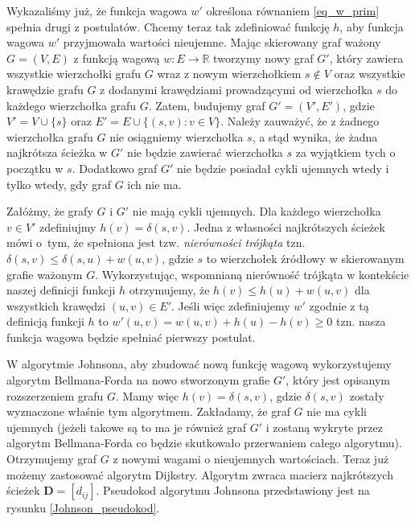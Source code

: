 \documentclass[12pt,a4paper]{book}
\theoremstyle{definition}
\newcommand{\bR}{{\mathbb R}}
\numberwithin{equation}{chapter}
\begin{document}
Wykazaliśmy już, że funkcja wagowa $w'$ określona równaniem \eqref{eq_w_prim} spełnia drugi z postulatów. 
Chcemy teraz tak zdefiniować funkcję $h$, aby funkcja wagowa $w'$ przyjmowała wartości nieujemne. Mając skierowany graf ważony $G = (V,E)$ z funkcją wagową $w\colon E\to\bR$ tworzymy nowy graf $G'$, który zawiera wszystkie wierzchołki grafu $G$ wraz z nowym wierzchołkiem $s \notin V$ oraz wszystkie krawędzie grafu $G$ z dodanymi krawędziami prowadzącymi od wierzchołka $s$ do każdego wierzchołka grafu $G$. Zatem, budujemy graf $G' = (V', E')$, gdzie $V' = V \cup \{s\}$ oraz $E' = E \cup \big\{(s, v): v \in V\big\}$. Należy zauważyć, że z żadnego wierzchołka grafu $G$ nie osiągniemy wierzchołka $s$, a stąd wynika, że żadna najkrótsza ścieżka w $G'$ nie będzie zawierać wierzchołka $s$ za wyjątkiem tych o początku w $s$. Dodatkowo graf $G'$ nie będzie posiadał cykli ujemnych wtedy i tylko wtedy, gdy graf $G$ ich nie ma.

Załóżmy, że grafy $G$ i $G'$ nie mają cykli ujemnych. Dla każdego wierzchołka $v \in V'$ zdefiniujmy $h(v) = \delta(s, v)$. Jedna z własności najkrótszych ścieżek mówi o~tym, że spełniona jest tzw. \textit{nierówności trójkąta} tzn.  $\delta(s,v) \leq \delta(s,u) + w(u, v)$, gdzie $s$ to wierzchołek źródłowy w skierowanym grafie ważonym $G$. Wykorzystując,  wspomnianą nierówność trójkąta w kontekście naszej definicji funkcji $h$ otrzymujemy, że $h(v) \leq h(u) + w(u,v)$ dla wszystkich krawędzi $(u, v) \in E'$. Jeśli więc zdefiniujemy $w'$ zgodnie z tą definicją funkcji $h$ to $w'(u,v) = w(u,v) + h(u) -h(v) \geq 0$ tzn. nasza funkcja wagowa będzie spełniać pierwszy postulat.

W algorytmie Johnsona, aby zbudować nową funkcję wagową wykorzystujemy algorytm Bellmana-Forda na nowo stworzonym grafie $G'$, który jest opisanym rozszerzeniem grafu $G$. Mamy więc $h(v) = \delta(s, v)$,  gdzie $\delta(s, v)$ zostały wyznaczone właśnie tym algorytmem. Zakładamy, że graf $G$ nie ma cykli ujemnych (jeżeli takowe są to ma je również graf $G'$ i zostaną wykryte przez algorytm Bellmana-Forda co będzie skutkowało przerwaniem całego algorytmu). Otrzymujemy graf $G$ z nowymi wagami o nieujemnych wartościach. Teraz już możemy zastosować algorytm Dijkstry. Algorytm zwraca macierz najkrótszych ścieżek $\mathbf{D} = [d_{i j}]$. Pseudokod algorytmu Johnsona przedstawiony jest na rysunku \ref{Johnson_pseudokod}.
\end{document}

